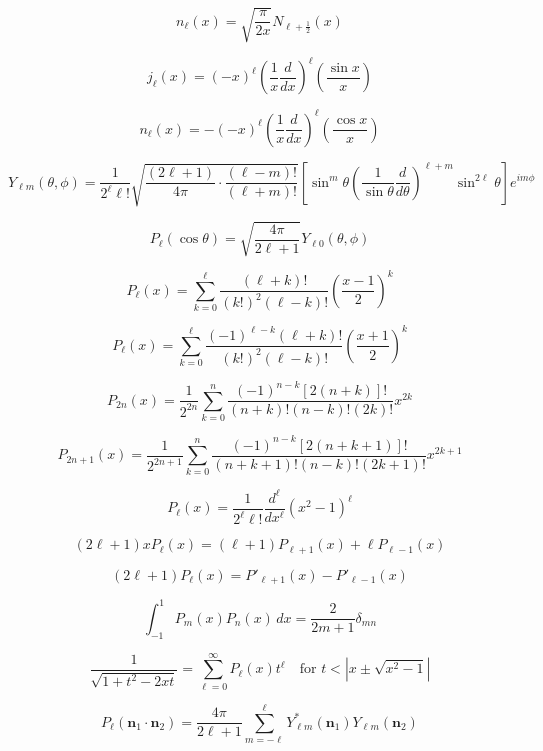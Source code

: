 \[
n_\ell(x) = \sqrt{\frac{\pi}{2x}} N_{\ell + \frac{1}{2}}(x)
\]

\[
j_\ell(x) = (-x)^\ell \left( \frac{1}{x} \frac{d}{dx} \right)^\ell \left( \frac{\sin x}{x} \right)
\]

\[
n_\ell(x) = -(-x)^\ell \left( \frac{1}{x} \frac{d}{dx} \right)^\ell \left( \frac{\cos x}{x} \right)
\]

\[
Y_{\ell m}(\theta, \phi) = 
\frac{1}{2^\ell \ell!}
\sqrt{\frac{(2\ell + 1)}{4\pi} \cdot \frac{(\ell - m)!}{(\ell + m)!}}
\left[ \sin^m \theta \left( \frac{1}{\sin \theta} \frac{d}{d\theta} \right)^{\ell + m} \sin^{2\ell} \theta \right]
e^{im\phi}
\]

\[
P_\ell(\cos \theta) = \sqrt{\frac{4\pi}{2\ell + 1}} Y_{\ell 0}(\theta, \phi)
\]

\[
P_\ell(x) = \sum_{k=0}^\ell \frac{(\ell + k)!}{(k!)^2 (\ell - k)!} \left( \frac{x - 1}{2} \right)^k
\]

\[
P_\ell(x) = \sum_{k=0}^\ell \frac{(-1)^{\ell - k} (\ell + k)!}{(k!)^2 (\ell - k)!} \left( \frac{x + 1}{2} \right)^k
\]

\[
P_{2n}(x) = \frac{1}{2^{2n}} \sum_{k=0}^n \frac{(-1)^{n - k} [2(n + k)]!}{(n + k)! (n - k)! (2k)!} x^{2k}
\]

\[
P_{2n+1}(x) = \frac{1}{2^{2n+1}} \sum_{k=0}^n \frac{(-1)^{n - k} [2(n + k + 1)]!}{(n + k + 1)! (n - k)! (2k + 1)!} x^{2k + 1}
\]

\[
P_\ell(x) = \frac{1}{2^\ell \ell!} \frac{d^\ell}{dx^\ell} (x^2 - 1)^\ell
\]

\[
(2\ell + 1) x P_\ell(x) = (\ell + 1) P_{\ell + 1}(x) + \ell P_{\ell - 1}(x)
\]

\[
(2\ell + 1) P_\ell(x) = P'_{\ell + 1}(x) - P'_{\ell - 1}(x)
\]

\[
\int_{-1}^1 P_m(x) P_n(x)\, dx = \frac{2}{2m + 1} \delta_{mn}
\]

\[
\frac{1}{\sqrt{1 + t^2 - 2xt}} = \sum_{\ell = 0}^\infty P_\ell(x) t^\ell
\quad \text{for } t < \left| x \pm \sqrt{x^2 - 1} \right|
\]

\[
P_\ell(\mathbf{n}_1 \cdot \mathbf{n}_2) = \frac{4\pi}{2\ell + 1} \sum_{m = -\ell}^\ell Y_{\ell m}^*(\mathbf{n}_1) Y_{\ell m}(\mathbf{n}_2)
\]